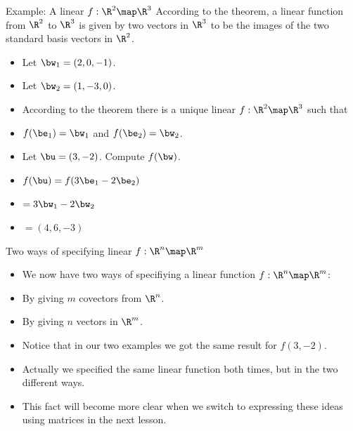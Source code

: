 \documentclass{beamer}
\begin{document}
\begin{frame}{Example: A linear $f:\R^2\map\R^3$}
According to the theorem, a linear function from $\R^2$ to $\R^3$ is
given by two vectors in $\R^3$ to be the images of the two standard
basis vectors in $\R^2$.

\begin{itemize}
\item Let $\bw_1 = (2, 0, -1)$.
\item Let $\bw_2 = (1, -3, 0)$.
\item According to the theorem there is a unique linear $f:\R^2\map\R^3$ such that
\item $f(\be_1) = \bw_1$ and $f(\be_2) = \bw_2$.
\item Let $\bu = (3, -2)$. Compute $f(\bw)$.
\item $f(\bu) = f(3\be_1 -2\be_2)$
\item $=3 \bw_1 -2\bw_2$
\item $=(4, 6, -3)$
\end{itemize}

\end{frame}

\begin{frame}{Two ways of specifying linear $f:\R^n\map\R^m$}

\begin{itemize}
\item We now have two ways of specifiying a linear function $f:\R^n\map\R^m$:
\item By giving $m$ covectors from $\R^n$.
\item By giving $n$ vectors in $\R^m$.
\item Notice that in our two examples we got the same result for $f(3,-2)$.
\item Actually we specified the same linear function both times, but in
the two different ways.
\item This fact will become more clear when we switch to expressing these
ideas using matrices in the next lesson.
\end{itemize}

\end{frame}
\end{document}
